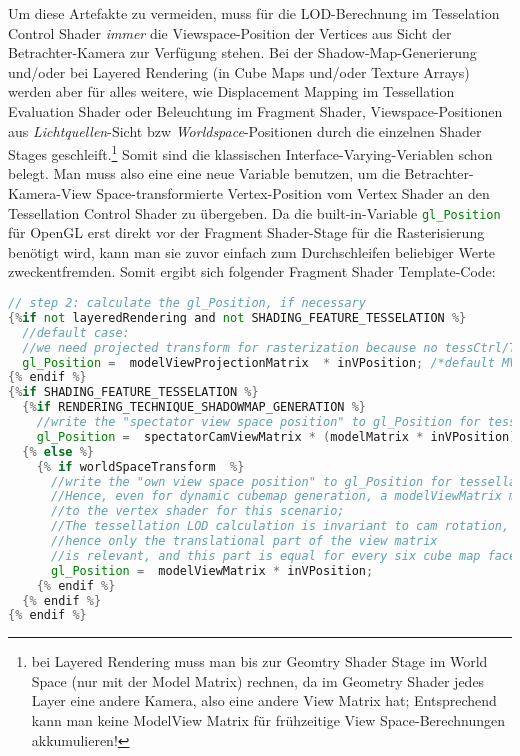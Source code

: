 	Um diese Artefakte zu vermeiden, muss für die LOD-Berechnung im Tesselation Control Shader
	\emph{immer} die Viewspace-Position der Vertices aus Sicht der Betrachter-Kamera zur Verfügung stehen.
	Bei der Shadow-Map-Generierung und/oder bei Layered Rendering (in Cube Maps und/oder Texture Arrays)
	werden aber für alles weitere, wie Displacement Mapping im Tessellation Evaluation Shader oder Beleuchtung
	im Fragment Shader, Viewspace-Positionen aus \emph{Lichtquellen}-Sicht bzw \emph{Worldspace}-Positionen durch die
	einzelnen Shader Stages geschleift.\footnote{bei Layered Rendering muss man bis zur Geomtry Shader Stage im 
	World Space (nur mit der Model Matrix) rechnen, da im Geometry Shader jedes Layer eine andere Kamera, also eine andere 
	View Matrix hat; Entsprechend kann  man keine ModelView Matrix für frühzeitige View Space-Berechnungen akkumulieren!}
	Somit sind die klassischen Interface-Varying-Veriablen schon belegt.
	Man muss also eine eine neue Variable benutzen, um die Betrachter-Kamera-View Space-transformierte Vertex-Position
	vom Vertex Shader an den Tessellation Control Shader zu übergeben. Da die built-in-Variable
	\lstinline[language=GLSL]|gl_Position| für OpenGL erst direkt vor der Fragment Shader-Stage für die Rasterisierung
	benötigt wird, kann man sie zuvor einfach zum Durchschleifen beliebiger Werte zweckentfremden. Somit ergibt sich
	folgender Fragment Shader Template-Code:
	\begin{lstlisting}[language=GLSL]
// step 2: calculate the gl_Position, if necessary 
{%if not layeredRendering and not SHADING_FEATURE_TESSELATION %} 
  //default case:
  //we need projected transform for rasterization because no tessCtrl/TessEval/geom shader follows the vertex shader;
  gl_Position =  modelViewProjectionMatrix  * inVPosition; /*default MVP transform*/   
{% endif %} 
{%if SHADING_FEATURE_TESSELATION %} 
  {%if RENDERING_TECHNIQUE_SHADOWMAP_GENERATION %}
    //write the "spectator view space position" to gl_Position for tessellation LOD calculations 
    gl_Position =  spectatorCamViewMatrix * (modelMatrix * inVPosition);
  {% else %}
    {% if worldSpaceTransform  %}
      //write the "own view space position" to gl_Position for tessellation LOD calculations; 
      //Hence, even for dynamic cubemap generation, a modelViewMatrix must be passed 
      //to the vertex shader for this scenario;
      //The tessellation LOD calculation is invariant to cam rotation, 
      //hence only the translational part of the view matrix
      //is relevant, and this part is equal for every six cube map faces;
      gl_Position =  modelViewMatrix * inVPosition;
    {% endif %}
  {% endif %}
{% endif %}
	\end{lstlisting}
	
